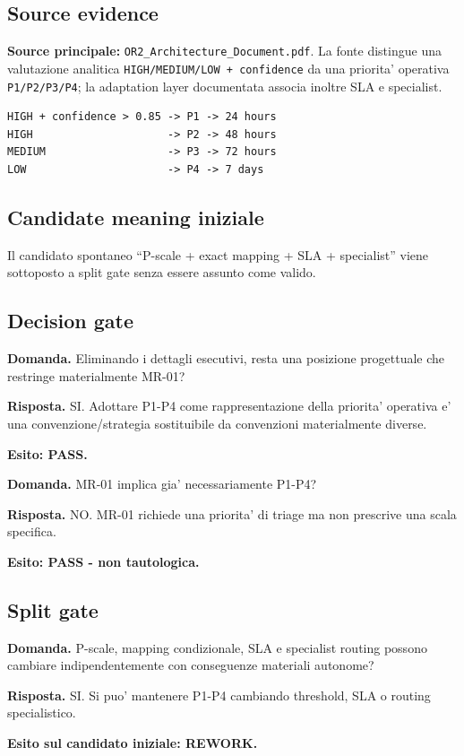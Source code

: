 \documentclass[11pt,a4paper]{article}
\begin{document}
\subsection{Source evidence}
\textbf{Source principale:} \texttt{OR2\_Architecture\_Document.pdf}. La fonte distingue una valutazione analitica \texttt{HIGH/MEDIUM/LOW + confidence} da una priorita' operativa \texttt{P1/P2/P3/P4}; la adaptation layer documentata associa inoltre SLA e specialist.

\begin{lstlisting}
HIGH + confidence > 0.85 -> P1 -> 24 hours
HIGH                     -> P2 -> 48 hours
MEDIUM                   -> P3 -> 72 hours
LOW                      -> P4 -> 7 days
\end{lstlisting}

\subsection{Candidate meaning iniziale}
Il candidato spontaneo ``P-scale + exact mapping + SLA + specialist'' viene sottoposto a split gate senza essere assunto come valido.

\subsection{Decision gate}
\begin{ddtacheck}
\textbf{Domanda.} Eliminando i dettagli esecutivi, resta una posizione progettuale che restringe materialmente MR-01?
\end{ddtacheck}
\textbf{Risposta.} SI. Adottare P1-P4 come rappresentazione della priorita' operativa e' una convenzione/strategia sostituibile da convenzioni materialmente diverse.\par
\textbf{Esito: PASS.}

\begin{ddtacheck}
\textbf{Domanda.} MR-01 implica gia' necessariamente P1-P4?
\end{ddtacheck}
\textbf{Risposta.} NO. MR-01 richiede una priorita' di triage ma non prescrive una scala specifica.\par
\textbf{Esito: PASS - non tautologica.}

\subsection{Split gate}
\begin{ddtacheck}
\textbf{Domanda.} P-scale, mapping condizionale, SLA e specialist routing possono cambiare indipendentemente con conseguenze materiali autonome?
\end{ddtacheck}
\textbf{Risposta.} SI. Si puo' mantenere P1-P4 cambiando threshold, SLA o routing specialistico.\par
\textbf{Esito sul candidato iniziale: REWORK.}
\end{document}
